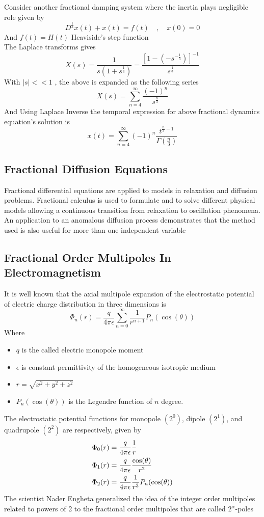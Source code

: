 Consider another fractional damping system where the inertia plays negligible role
given by
\[
    D^{\frac{1}{3}} x(t) + x(t) = f(t) \quad,\quad x(0)= 0
\]
And $f(t) = H(t)$ Heaviside's step function
\\
The Laplace transforms gives
\[
    X(s) = \frac{1}{s(1+s^{\frac{1}{3}})} = \frac{\left[1-(-s^{-\frac{1}{3}})\right]^{-1}}{s^{\frac{4}{3}}}
\]
With $|s|<< 1$ , the above is expanded as the following series
\[
    X(s) = \sum_{n=4}^{\infty} \frac{(-1)^n}{s^{\frac{n}{3}}}
\]
And Using Laplace Inverse the temporal expression for above fractional dynamics equation's solution is
\[
    x(t) = \sum_{n=4}^{\infty}(-1)^n \frac{t^{\frac{n}{3}-1}}{\Gamma(\frac{n}{3})}
\]


\subsection{Fractional Diffusion Equations}
Fractional differential equations are applied to models in relaxation and
diffusion problems. Fractional calculus is used to formulate and to solve
different physical models allowing a continuous transition from relaxation
to oscillation phenomena. An application to an anomalous diffusion process
demonstrates that the method used is also useful for more than one
independent variable

\newpage

\subsection{Fractional Order Multipoles In Electromagnetism}
It is well known that the axial multipole expansion of the
electrostatic potential of electric charge distribution in three
dimensions is
\[
    \Phi_n(r) = \frac{q}{4\pi \epsilon} \sum_{n=0}^{\infty} \frac{1}{r^{n+1}} P_n(\cos(\theta))
\]
Where 
\begin{itemize}
    \item $q$ is the called electric monopole moment
    \item $\epsilon$ is constant permittivity of the homogeneous isotropic medium
    \item $r = \sqrt{x^2 + y^2 + z^2}$
    \item $P_n(\cos(\theta))$ is the Legendre function of $n$ degree.     
\end{itemize}
The electrostatic potential functions for monopole $(2^0)$, dipole $(2^1)$, and 
quadrupole $(2^2)$ are respectively, given by
\begin{align}
    \notag \Phi_0(r) &= \frac{q}{4\pi \epsilon} \frac{1}{r}
    \\
    \Phi_1(r) &= \frac{q}{4\pi \epsilon} \frac{\cos(\theta)}{r^{2}} 
    \\
    \notag \Phi_2(r) &= \frac{q}{4\pi \epsilon} \frac{1}{r^{3}} P_n(\cos(\theta))
\end{align}
The scientist Nader Engheta generalized the idea of the integer order multipoles 
related to powers of 2 to the fractional order multipoles that are called $2^{\alpha}$-poles

